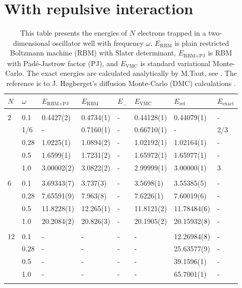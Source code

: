 \section{With repulsive interaction}
\begin{table} [H]
	\caption{This table presents the energies of $N$ electrons trapped in a two-dimensional oscillator well with frequency $\omega$. $E_{\text{RBM}}$ is plain restricted Boltzmann machine (RBM) with Slater determinant, $E_{\text{RBM+PJ}}$ is RBM with Padé-Jastrow factor (PJ), and $E_{\text{VMC}}$ is standard variational Monte-Carlo. The exact energies are calculated analytically by M.Taut, see \cite{taut_two_1994}. The reference is to J. Høgberget's diffusion Monte-Carlo (DMC) calculations \cite{hogberget_quantum_2013}.} 
	\begin{tabularx}{\textwidth}{l:l|XXXXXX} \hline\hline
		\label{tab:quantumdotswinteraction2D}
		$N$ & $\omega$ & $E_{\text{RBM+PJ}}$ & $E_{\text{RBM}}$ & $E_{\text{...}}$ & $E_{\text{VMC}}$ & $E_{\text{ref}} $ & $E_{\text{exact}}$ \\ \hline \\
		2 & 0.1 & 0.4427(2) & 0.4734(1) & - & 0.44128(1) & 0.44079(1) & - \\ 
		& 1/6 & - & 0.7160(1) & - & 0.66710(1) & - & 2/3 \\
		& 0.28 & 1.0225(1) & 1.0894(2) & - & 1.02192(1) & 1.02164(1) & - \\
		& 0.5 & 1.6599(1) & 1.7231(2) & - & 1.65972(1) & 1.65977(1)  & - \\
		& 1.0 & 3.00002(2) & 3.0822(2) & - & 2.99999(1) & 3.00000(1) & 3  \\ \hdashline \\

		6 & 0.1 & 3.69343(7) & 3.737(3) & - & 3.5698(1) & 3.55385(5) & - \\ 
		& 0.28 & 7.65591(9) & 7.963(8) & - & 7.6226(1) & 7.60019(6) & - \\
		& 0.5 & 11.8228(1) & 12.265(1) & - & 11.8121(2) & 11.78484(6) & - \\
		& 1.0 & 20.2084(2) & 20.826(3) & - & 20.1905(2) & 20.15932(8) & - \\ \hdashline \\
		
		12 & 0.1 & - & - & - & - & 12.26984(8) & -\\ 
		& 0.28 & - & - & - & - & 25.63577(9) & -\\
		& 0.5 & - & - & - & - & 39.1596(1) & - \\
		& 1.0 & - & - & - & - & 65.7001(1) & - \\ \hdashline \\
		

\end{tabularx}
\end{table}
